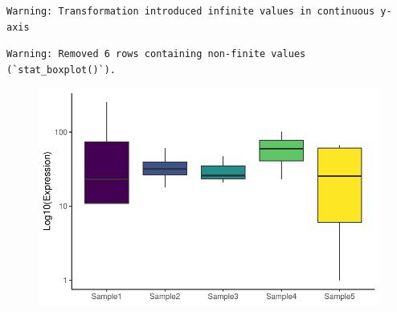 \documentclass[
  letterpaper,
  DIV=11,
  numbers=noendperiod,
  landscape]{scrartcl}
\begin{document}
\begin{verbatim}
Warning: Transformation introduced infinite values in continuous y-axis
\end{verbatim}

\begin{verbatim}
Warning: Removed 6 rows containing non-finite values (`stat_boxplot()`).
\end{verbatim}

\begin{figure}[H]

{\centering \includegraphics{RandRStudio_files/figure-pdf/unnamed-chunk-32-1.pdf}

}

\end{figure}
\end{document}
